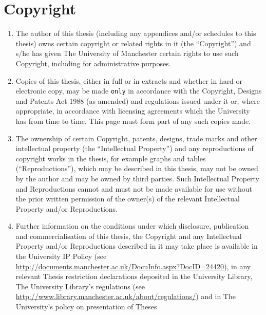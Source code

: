 \section*{Copyright}

\begin{enumerate}
    \item The author of this thesis (including any appendices and/or schedules to this thesis) owns certain copyright or related rights in it (the “Copyright”) and s/he has given The University of Manchester certain rights to use such Copyright, including for administrative purposes.

    \item Copies of this thesis, either in full or in extracts and whether in
    hard or electronic copy, may be made \texttt{only} in accordance with the Copyright, Designs and Patents Act 1988 (as amended) and regulations issued under it or, where appropriate, in accordance with licensing agreements which the University has from time to time. This page must form part of any such copies made.

    \item The ownership of certain Copyright, patents, designs, trade marks and other intellectual property (the “Intellectual Property”) and any reproductions of copyright works in the thesis, for example graphs and tables (“Reproductions”), which may be described in this thesis, may not be owned by the author and may be owned by third parties. Such Intellectual Property and Reproductions cannot and must not be made available for use without the prior written permission of the owner(s) of the relevant Intellectual Property and/or Reproductions.

    \item Further information on the conditions under which disclosure,
        publication and commercialisation of this thesis, the Copyright and any
        Intellectual Property and/or Reproductions described in it may take
        place is available in the University IP Policy (see
        \href{http://documents.manchester.ac.uk/DocuInfo.aspx?DocID=24420}{\url{http://documents.manchester.ac.uk/DocuInfo.aspx?DocID=24420}}),
        in any relevant Thesis restriction declarations deposited in the
        University Library, The University Library’s regulations (see
        \href{http://www.library.manchester.ac.uk/about/regulations/}{\url{http://www.library.manchester.ac.uk/about/regulations/}}) and in The University’s policy on presentation of Theses
\end{enumerate}

